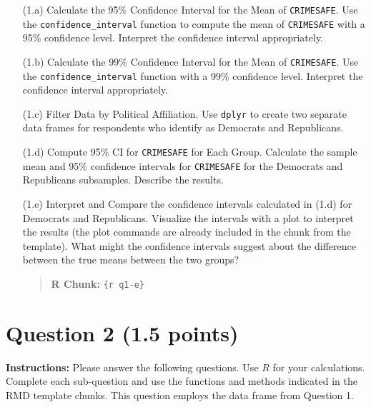 \documentclass[11pt]{article}
\begin{document}
\begin{itemize}
    \item[(1.a)] Calculate the 95\% Confidence Interval for the Mean of \texttt{CRIMESAFE}. Use the \texttt{confidence\_interval} function to compute the mean of \texttt{CRIMESAFE} with a 95\% confidence level. Interpret the confidence interval appropriately. 

    \item[(1.b)] Calculate the 99\% Confidence Interval for the Mean of \texttt{CRIMESAFE}. Use the \texttt{confidence\_interval} function with a 99\% confidence level. Interpret the confidence interval appropriately. 

    \item[(1.c)] Filter Data by Political Affiliation. Use \texttt{dplyr} to create two separate data frames for respondents who identify as Democrats and Republicans.

    \item[(1.d)] Compute 95\% CI for \texttt{CRIMESAFE} for Each Group. Calculate the sample mean and 95\% confidence intervals for \texttt{CRIMESAFE} for the Democrats and Republicans subsamples. Describe the results.

    \item[(1.e)] Interpret and Compare the confidence intervals calculated in (1.d) for Democrats and Republicans.  Visualize the intervals with a plot to interpret the results (the plot commands are already included in the chunk from the template). What might the confidence intervals suggest about the difference between the true means between the two groups? 
    \begin{quote}
    \textbf{R Chunk:} \texttt{\{r q1-e\}}
    \end{quote}
\end{itemize}

\newpage
\section*{Question 2 (1.5 points)}

\textbf{Instructions:} Please answer the following questions. Use $R$ for your calculations. Complete each sub-question and use the functions and methods indicated in the RMD template chunks. This question employs the data frame from Question 1.
\end{document}
